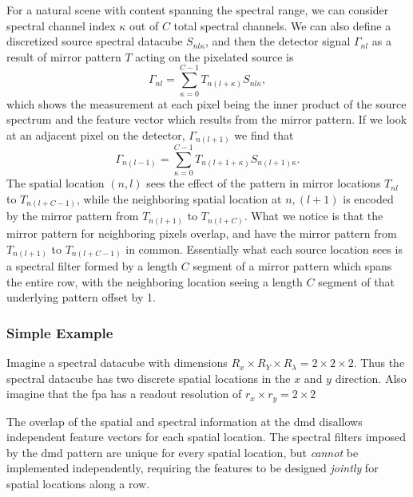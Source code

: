 For a natural scene with content spanning the spectral range, we can consider spectral channel index $\kappa$ out of $C$ total spectral channels.
We can also define a discretized source spectral datacube $S_{nl\kappa}$, and then the detector signal $\Gamma_{nl}$ as a result of mirror pattern $T$ acting on the pixelated source is
%
%
\begin{equation}
	\Gamma_{nl} = \sum^{C-1}_{\kappa = 0} T_{n \left( l + \kappa \right)} S_{nl\kappa},
\end{equation}
%
%
which shows the measurement at each pixel being the inner product of the source spectrum and the feature vector which results from the mirror pattern. If we look at an adjacent pixel on the detector, $\Gamma_{n \left(l +1 \right)}$ we find that
%
%
\begin{equation}
\Gamma_{n\left(l-1\right)} = \sum^{C-1}_{\kappa = 0} T_{n\left( l + 1 + \kappa \right)} S_{n\left(l+1\right)\kappa}.
\end{equation}
%
%
The spatial location $\left(n,l \right)$ sees the effect of the pattern in mirror locations $T_{nl}$ to $T_{n\left(l+C-1\right)}$, while the neighboring spatial location at $n, \left( l + 1\right)$ is encoded by the mirror pattern from $T_{n\left(l+1\right)}$ to $T_{n\left(l + C \right)}$. What we notice is that the mirror pattern for neighboring pixels overlap, and have the mirror pattern from $T_{n\left( l + 1 \right)}$ to $T_{n\left(l + C - 1 \right)}$ in common. Essentially what each source location sees is a spectral filter formed by a length $C$ segment of a mirror pattern which spans the entire row, with the neighboring location seeing a length $C$ segment of that underlying pattern offset by 1.

\subsubsection{Simple Example}

Imagine a spectral datacube with dimensions $R_x \times R_Y \times R_\lambda = 2 \times 2 \times 2$. Thus the spectral datacube has two discrete spatial locations in the $x$ and $y$ direction. Also imagine that the \gls{fpa} has a readout resolution of $r_x \times r_y = 2 \times 2$

The overlap of the spatial and spectral information at the \gls{dmd} disallows independent feature vectors for each spatial location. The spectral filters imposed by the \gls{dmd} pattern are unique for every spatial location, but \textit{cannot} be implemented independently, requiring the features to be designed \textit{jointly} for spatial locations along a row.



